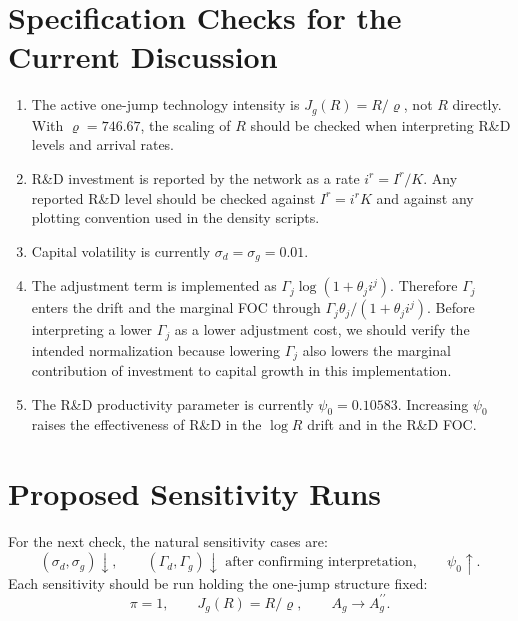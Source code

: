 \documentclass[11pt]{article}
\begin{document}
\section{Specification Checks for the Current Discussion}

\begin{enumerate}
\item The active one-jump technology intensity is $J_g(R)=R/\varrho$, not $R$ directly.  With $\varrho=746.67$, the scaling of $R$ should be checked when interpreting R\&D levels and arrival rates.
\item R\&D investment is reported by the network as a rate $i^r=I^r/K$.  Any reported R\&D level should be checked against $I^r=i^rK$ and against any plotting convention used in the density scripts.
\item Capital volatility is currently $\sigma_d=\sigma_g=0.01$.
\item The adjustment term is implemented as $\Gamma_j\log(1+\theta_j i^j)$.  Therefore $\Gamma_j$ enters the drift and the marginal FOC through $\Gamma_j\theta_j/(1+\theta_j i^j)$.  Before interpreting a lower $\Gamma_j$ as a lower adjustment cost, we should verify the intended normalization because lowering $\Gamma_j$ also lowers the marginal contribution of investment to capital growth in this implementation.
\item The R\&D productivity parameter is currently $\psi_0=0.10583$.  Increasing $\psi_0$ raises the effectiveness of R\&D in the $\log R$ drift and in the R\&D FOC.
\end{enumerate}

\section{Proposed Sensitivity Runs}

For the next check, the natural sensitivity cases are:
\[
(\sigma_d,\sigma_g)\downarrow,\qquad
(\Gamma_d,\Gamma_g)\downarrow \text{ after confirming interpretation},\qquad
\psi_0\uparrow.
\]
Each sensitivity should be run holding the one-jump structure fixed:
\[
\pi=1,\qquad J_g(R)=R/\varrho,\qquad
A_g\rightarrow A_g^{\prime\prime}.
\]
\end{document}
